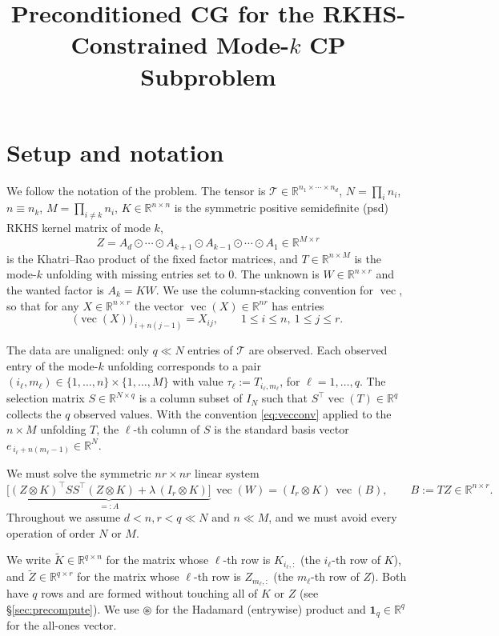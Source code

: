 \documentclass[12pt]{article}
\title{Preconditioned CG for the RKHS-Constrained Mode-$k$ CP Subproblem}
\author{}
\date{}
\DeclareMathOperator{\vecop}{vec}
\newcommand{\bR}{\mathbb{R}}
\newcommand{\tZ}{\tilde{Z}}
\newcommand{\tK}{\tilde{K}}
\newcommand{\KR}{\odot}
\begin{document}
\maketitle

\section{Setup and notation}

We follow the notation of the problem. The tensor is
$\mathcal{T}\in\bR^{n_1\times\cdots\times n_d}$, $N=\prod_i n_i$,
$n\equiv n_k$, $M=\prod_{i\neq k}n_i$, $K\in\bR^{n\times n}$ is the
symmetric positive semidefinite (psd) RKHS kernel matrix of mode $k$,
\[
  Z=A_d\KR\cdots\KR A_{k+1}\KR A_{k-1}\KR\cdots\KR A_1\in\bR^{M\times r}
\]
is the Khatri--Rao product of the fixed factor matrices, and
$T\in\bR^{n\times M}$ is the mode-$k$ unfolding with missing entries set
to $0$. The unknown is $W\in\bR^{n\times r}$ and the wanted factor is
$A_k=KW$. We use the column-stacking convention for $\vecop$, so that for
any $X\in\bR^{n\times r}$ the vector $\vecop(X)\in\bR^{nr}$ has entries
\begin{equation}\label{eq:vecconv}
  \big(\vecop(X)\big)_{\,i+n(j-1)}=X_{ij},
  \qquad 1\le i\le n,\ 1\le j\le r .
\end{equation}

The data are unaligned: only $q\ll N$ entries of $\mathcal{T}$ are
observed. Each observed entry of the mode-$k$ unfolding corresponds to a
pair $(i_\ell,m_\ell)\in\{1,\dots,n\}\times\{1,\dots,M\}$ with value
$\tau_\ell:=T_{i_\ell,m_\ell}$, for $\ell=1,\dots,q$. The selection
matrix $S\in\bR^{N\times q}$ is a column subset of $I_N$ such that
$S^{\top}\vecop(T)\in\bR^q$ collects the $q$ observed values. With the
convention \eqref{eq:vecconv} applied to the $n\times M$ unfolding $T$,
the $\ell$-th column of $S$ is the standard basis vector
$e_{\,i_\ell+n(m_\ell-1)}\in\bR^N$.

We must solve the symmetric $nr\times nr$ linear system
\begin{equation}\label{eq:system}
  \underbrace{\Big[(Z\otimes K)^{\top}SS^{\top}(Z\otimes K)
      +\lambda\,(I_r\otimes K)\Big]}_{=:A}\,
  \vecop(W)=(I_r\otimes K)\,\vecop(B),
  \qquad B:=TZ\in\bR^{n\times r}.
\end{equation}
Throughout we assume $d<n,r<q\ll N$ and $n\ll M$, and we must avoid every
operation of order $N$ or $M$.

We write $\tK\in\bR^{q\times n}$ for the matrix whose $\ell$-th row is
$K_{i_\ell,:}$ (the $i_\ell$-th row of $K$), and $\tZ\in\bR^{q\times r}$
for the matrix whose $\ell$-th row is $Z_{m_\ell,:}$ (the $m_\ell$-th row
of $Z$). Both have $q$ rows and are formed without touching all of $K$ or
$Z$ (see \S\ref{sec:precompute}). We use $\circledast$ for the Hadamard
(entrywise) product and $\mathbf 1_q\in\bR^q$ for the all-ones vector.
\end{document}
